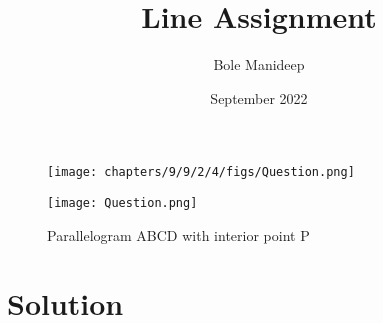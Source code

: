 \documentclass[journal,10pt,twocolumn]{article}
\title{\textbf{Line Assignment}}
\author{Bole Manideep}
\date{September 2022}
\begin{document}
\maketitle
\fi

	\begin{figure}[H]
		\centering
 \texttt{[image: chapters/9/9/2/4/figs/Question.png]}
		\caption{}
		\label{fig:9/9/2/4}
  	\end{figure}
	\iffalse
\begin{figure}[H]
\centering
\texttt{[image: Question.png]}
\caption{Parallelogram ABCD with interior point P}
\label{fig:Parallelogram}
\end{figure}

\section*{Solution}
\end{document}
